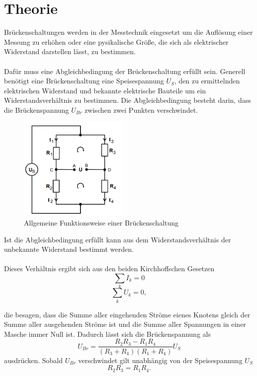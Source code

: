 \section{Theorie}
\label{sec:Theorie}
Brückenschaltungen werden in der Messtechnik 
eingesetzt um die Auflösung einer Messung zu erhöhen
oder eine pysikalische Größe,
die sich als elektrischer Widerstand darstellen lässt,
zu bestimmen. \\
\\
Dafür muss eine Abgleichbedingung der
Brückenschaltung erfüllt sein. Generell benötigt eine
Brückenschaltung eine Speisespannung $U_S$, den zu
ermittelnden elektrischen Widerstand und bekannte
elektrische Bauteile um ein Widerstandsverhältnis
zu bestimmen.
Die Abgleichbedingung besteht darin, dass die
Brückenspannung $U_{Br}$ zwischen zwei Punkten
verschwindet.

\begin{figure}[H]
\centering
    \includegraphics[height= 5cm]{content/Allgemein.png}
    \caption{Allgemeine Funktionsweise einer Brückenschaltung\cite[216]{sample}}
\end{figure}

\noindent Ist die Abgleichbedingung erfüllt kann
aus dem Widerstandsverhältnis der
unbekannte Widerstand bestimmt werden.\\
\\
Dieses Verhältnis ergibt sich aus den beiden
Kirchhoffschen Gesetzen
\begin{equation}
   \sum_{k} I_k =0
\end{equation}
\begin{equation}
    \sum_{k} U_k =0,
\end{equation}

\noindent die besagen, dass die Summe aller eingehenden
Ströme eienes Knotens gleich der Summe aller ausgehenden
Ströme ist und die Summe aller Spannungen in einer Masche
immer Null ist.
Dadurch lässt sich die Brückenspannung als
\begin{equation}
    U_{Br}=\frac{R_2R_3-R_1R_4}{(R_3+R_4)(R_1+R_4)}U_S
    \label{eq:b}
\end{equation}
\noindent ausdrücken. Sobald $U_{Br}$ verschwindet gilt unabhängig von der
Speisespannung $U_S$
\begin{equation}
    R_2R_3=R_1R_4.
    \label{eq:a}
\end{equation}





